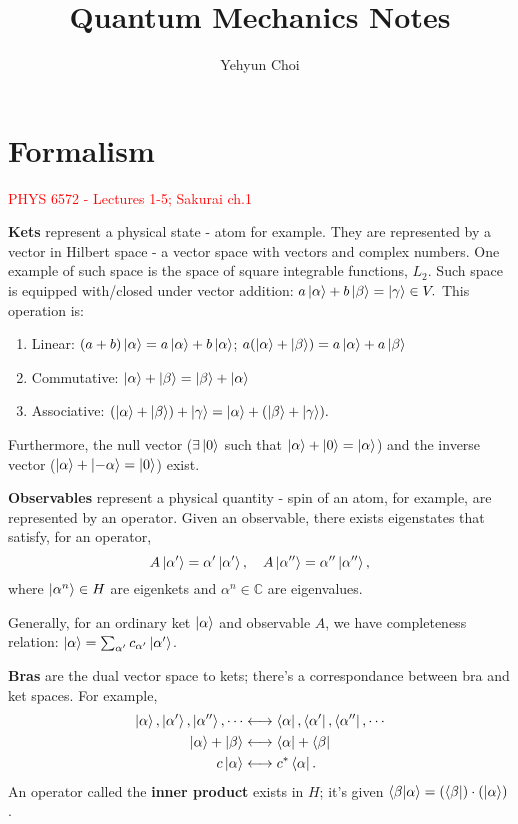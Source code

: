 \documentclass{article}
\title{Quantum Mechanics Notes}
\author{Yehyun Choi}
\begin{document}
\maketitle
\pagebreak 

\section{Formalism}
\textcolor{red}{PHYS 6572 - Lectures 1-5; Sakurai ch.1}

\textbf{Kets} represent a physical state - atom for example. They are represented by a vector in Hilbert space - a vector space with vectors and complex numbers. One example of such space is the space of square integrable functions, $L_2$. Such space is equipped with/closed under vector addition: $a\ket\alpha+b\ket\beta=\ket\gamma\in V.$ This operation is:
\begin{enumerate}
    \item Linear: $(a+b)\ket\alpha=a\ket\alpha+b\ket\alpha$; $a(\ket\alpha+\ket\beta)=a\ket\alpha+a\ket\beta$
    \item Commutative: $\ket\alpha+\ket\beta=\ket\beta+\ket\alpha$
    \item Associative: $(\ket\alpha+\ket\beta)+\ket\gamma=\ket\alpha+(\ket\beta+\ket\gamma).$
\end{enumerate}
Furthermore, the null vector ($\exists\ket 0$ such that $\ket\alpha+\ket 0=\ket\alpha$) and the inverse vector ($\ket\alpha+\ket{-\alpha}=\ket 0$) exist.

\textbf{Observables} represent a physical quantity - spin of an atom, for example, are represented by an operator. Given an observable, there exists eigenstates that satisfy, for an operator,
$$A\ket{\alpha'}=\alpha'\ket{\alpha'},\quad A\ket{\alpha''}=\alpha''\ket{\alpha''},$$
where $\ket{\alpha^{n}}\in H$ are eigenkets and $\alpha^n\in\mathbb C$ are eigenvalues.

Generally, for an ordinary ket $\ket\alpha$ and observable $A$, we have completeness relation: $\ket\alpha=\sum_{\alpha'}c_{\alpha'}\ket{\alpha'}$.

\textbf{Bras} are the dual vector space to kets; there's a correspondance between bra and ket spaces. For example,
\begin{align*}
    \ket\alpha,\ket{\alpha'},\ket{\alpha''},\cdots&\longleftrightarrow\bra\alpha,\bra{\alpha'},\bra{\alpha''},\cdots\\
    \ket\alpha+\ket\beta&\longleftrightarrow\bra\alpha+\bra\beta\\
    c\ket\alpha&\longleftrightarrow c^*\bra\alpha.
\end{align*}
An operator called the \textbf{inner product} exists in $H$; it's given $\braket{\beta}{\alpha}=(\bra\beta)\cdot(\ket\alpha)$. 
\end{document}
